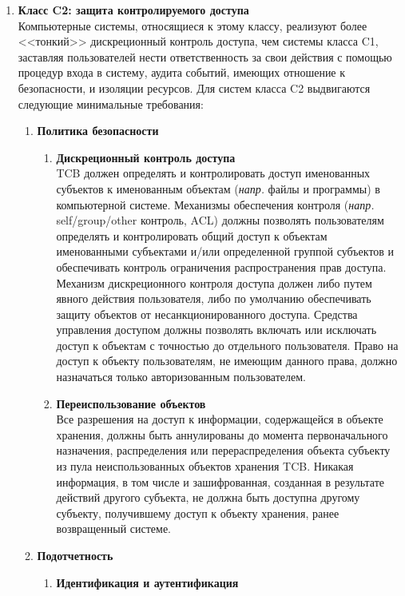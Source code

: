 \begin{enumerate}
\begin{enumerate}
		\item{\textbf{Класс C2: защита контролируемого доступа}}\\
		Компьютерные системы, относящиеся к этому классу, реализуют более <<тонкий>> дискреционный контроль доступа, чем системы класса C1, заставляя пользователей нести ответственность за свои
		действия с помощью процедур входа в систему, аудита событий, имеющих отношение к безопасности, и изоляции ресурсов. Для систем класса C2 выдвигаются следующие минимальные требования:
		\begin{enumerate}
			\item{\textbf{Политика безопасности}}
			\begin{enumerate}
				\item{\textbf{Дискреционный контроль доступа}}\\
				TCB должен определять и контролировать доступ именованных субъектов к именованным объектам (\textit{напр.} файлы и программы) в компьютерной системе. Механизмы обеспечения контроля
				(\textit{напр.} self/group/other контроль, ACL) должны позволять пользователям определять и контролировать общий доступ к объектам именованными субъектами и/или определенной группой
				субъектов и обеспечивать контроль ограничения распространения прав доступа. Механизм дискреционного контроля доступа должен либо путем явного действия пользователя, либо по умолчанию
				обеспечивать защиту объектов от несанкционированного доступа. Средства управления доступом должны позволять включать или исключать доступ к объектам с точностью до отдельного
				пользователя. Право на доступ к объекту пользователям, не имеющим данного права, должно назначаться только авторизованным пользователем.
				\item{\textbf{Переиспользование объектов}}\\
				Все разрешения на доступ к информации, содержащейся в объекте хранения, должны быть аннулированы до момента первоначального назначения, распределения или перераспределения объекта
				субъекту из пула неиспользованных объектов хранения TCB. Никакая информация, в том числе и зашифрованная, созданная в результате действий другого субъекта, не должна быть доступна
				другому субъекту, получившему доступ к объекту хранения, ранее возвращенный системе.
			\end{enumerate}
			\item{\textbf{Подотчетность}}
			\begin{enumerate}
				\item{\textbf{Идентификация и аутентификация}}\\

\end{enumerate}
\end{enumerate}
\end{enumerate}
\end{enumerate}
